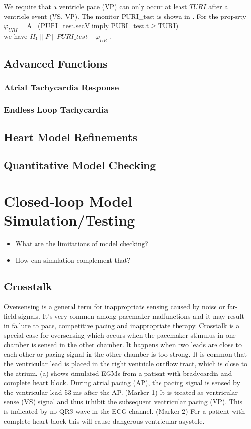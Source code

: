 We require that a ventricle pace (VP) can only occur at least $TURI$ after a ventricle event (VS, VP). The monitor \textsf{PURI\_test} is shown in . For the property\\
$\varphi_{URI}=$\textsf{A[] (PURI\_test.secV imply PURI\_test.t$\geq$TURI)} \\
we have $H_4\| P\| PURI\_test\models \varphi_{URI}$.\section{Advanced Functions}
\subsection{Atrial Tachycardia Response}
\subsection{Endless Loop Tachycardia}
\section{Heart Model Refinements}
    
\section{Quantitative Model Checking}

\chapter{Closed-loop Model Simulation/Testing}
\begin{itemize}
	\item What are the limitations of model checking?
    \item How can simulation complement that?
\end{itemize}

\section{Crosstalk}
Oversensing is a general term for inappropriate sensing caused by noise or far-field signals. It's very common among pacemaker malfunctions and it may result in failure to pace, competitive pacing and inappropriate therapy. Crosstalk is a special case for oversensing which occurs when the pacemaker stimulus in one chamber is sensed in the other chamber. It happens when two leads are close to each other or pacing signal in the other chamber is too strong. It is common that the ventricular lead is placed in the right ventricle outflow tract, which is close to the atrium. (a) shows simulated EGMs from a patient with bradycardia and complete heart block. During atrial pacing (AP), the pacing signal is sensed by the ventricular lead 53 ms after the AP. (Marker 1) It is treated as ventricular sense (VS) signal and thus inhibit the subsequent ventricular pacing (VP). This is indicated by no QRS-wave in the ECG channel. (Marker 2) For a patient with complete heart block this will cause dangerous ventricular asystole.  

